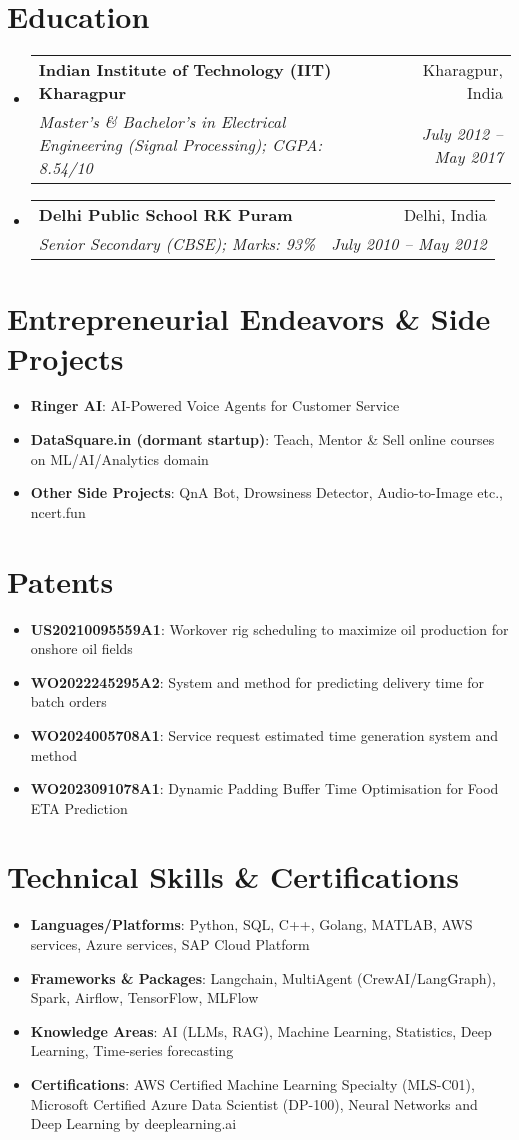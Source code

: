 \documentclass[letterpaper,11pt]{article}
\makeatletter
\newcommand{\resumeItem}[2]{
  \item\small{
    \textbf{#1}{: #2 \vspace{-2pt}}
  }
}
\newcommand{\resumeSubheading}[4]{
  \vspace{-1pt}\item
    \begin{tabular*}{0.97\textwidth}[t]{l@{\extracolsep{\fill}}r}
      \textbf{#1} & #2 \\
      \textit{\small#3} & \textit{\small #4} \\
    \end{tabular*}\vspace{-5pt}
}
\newcommand{\resumeSubItem}[2]{\resumeItem{#1}{#2}\vspace{-4pt}}
\newcommand{\resumeSubHeadingListStart}{\begin{itemize}[leftmargin=*]}
\newcommand{\resumeSubHeadingListEnd}{\end{itemize}}
\makeatother
\begin{document}
\section{Education}
  \resumeSubHeadingListStart
    \resumeSubheading
      {Indian Institute of Technology (IIT) Kharagpur}{Kharagpur, India}
      {Master’s \& Bachelor’s in Electrical Engineering (Signal Processing); CGPA: 8.54/10}{July 2012 -- May 2017}
    \resumeSubheading
      {Delhi Public School RK Puram}{Delhi, India}
      {Senior Secondary (CBSE); Marks: 93\%}{July 2010 -- May 2012}
  \resumeSubHeadingListEnd

\section{Entrepreneurial Endeavors \& Side Projects}
  \resumeSubHeadingListStart
    \resumeSubItem{Ringer AI}
      {AI-Powered Voice Agents for Customer Service}
    \resumeSubItem{DataSquare.in (dormant startup)}
      {Teach, Mentor \& Sell online courses on ML/AI/Analytics domain}
    \resumeSubItem{Other Side Projects}
      {QnA Bot, Drowsiness Detector, Audio-to-Image etc., ncert.fun}
  \resumeSubHeadingListEnd

\section{Patents}
  \resumeSubHeadingListStart
    \resumeSubItem{US20210095559A1}
      {Workover rig scheduling to maximize oil production for onshore oil fields}
    \resumeSubItem{WO2022245295A2}
      {System and method for predicting delivery time for batch orders}
    \resumeSubItem{WO2024005708A1}
      {Service request estimated time generation system and method}
    \resumeSubItem{WO2023091078A1}
      {Dynamic Padding Buffer Time Optimisation for Food ETA Prediction}
  \resumeSubHeadingListEnd

\section{Technical Skills \& Certifications}
  \resumeSubHeadingListStart
    \resumeSubItem{Languages/Platforms}
      {Python, SQL, C++, Golang, MATLAB, AWS services, Azure services, SAP Cloud Platform}
    \resumeSubItem{Frameworks \& Packages}
      {Langchain, MultiAgent (CrewAI/LangGraph), Spark, Airflow, TensorFlow, MLFlow}
    \resumeSubItem{Knowledge Areas}
      {AI (LLMs, RAG), Machine Learning, Statistics, Deep Learning, Time-series forecasting}
    \resumeSubItem{Certifications}
      {AWS Certified Machine Learning Specialty (MLS-C01), Microsoft Certified Azure Data Scientist (DP-100), Neural Networks and Deep Learning by deeplearning.ai}
  \resumeSubHeadingListEnd
\end{document}
